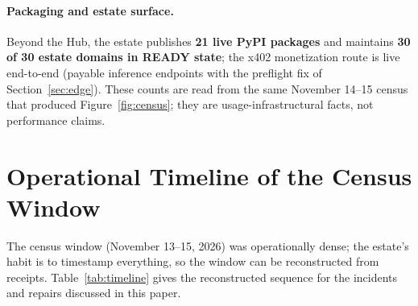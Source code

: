 \paragraph{Packaging and estate surface.} Beyond the Hub, the estate publishes \textbf{21 live PyPI packages} and maintains \textbf{30 of 30 estate domains in READY state}; the x402 monetization route is live end-to-end (payable inference endpoints with the preflight fix of Section~\ref{sec:edge}). These counts are read from the same November 14--15 census that produced Figure~\ref{fig:census}; they are usage-infrastructural facts, not performance claims.

\section{Operational Timeline of the Census Window}
\label{sec:timeline}

The census window (November 13--15, 2026) was operationally dense; the estate's habit is to timestamp everything, so the window can be reconstructed from receipts. Table~\ref{tab:timeline} gives the reconstructed sequence for the incidents and repairs discussed in this paper.

